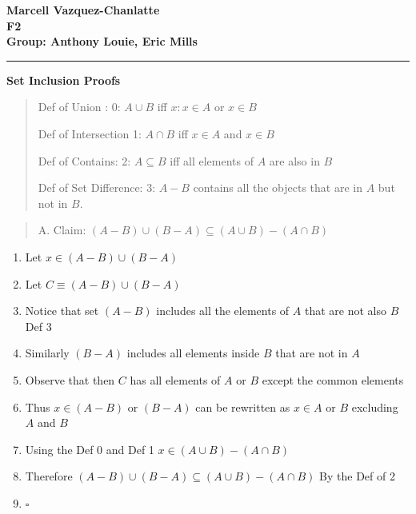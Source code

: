 \documentclass[12pt]{article}
\begin{document}
\begin{center}
  {\LARGE
    \textbf{Marcell Vazquez-Chanlatte}
    \\
    \textbf{F2}
    \\
    \textbf{Group: Anthony Louie, Eric Mills}
    \\[1ex]}

\end{center}

\bigskip\hrule

\begin{enumerate}


\item \textbf{Set Inclusion Proofs}

  \begin{quote}
  \item Def of Union : 0: $A \cup B$ iff  $x:x\in A$ or $x \in B$
  \item Def of Intersection 1: $A \cap B$ iff $x \in A$ and $x \in B$
  \item Def of Contains: 2: $A \subseteq B$ iff all elements of $A$ are also in $B$
  \item Def of Set Difference: 3: $A-B$ contains all the objects that are in $A$ but not in $B$.
  \end{quote}

  \begin{quote}
  \item A. Claim: $(A-B) \cup (B-A) \subseteq (A \cup B) - (A \cap B)$
  \end{quote}

  \begin{enumerate}
  \item Let $x \in (A-B) \cup (B-A)$
  \item Let $ C \equiv (A-B) \cup (B-A)$
  \item Notice that set $(A-B)$ includes all the elements of $A$ that
    are not also $B$ Def 3
  \item Similarly $(B-A)$ includes all elements inside $B$ that are
    not in $A$
  \item Observe that then $C$ has all elements of $A$ or $B$ except
    the common elements
  \item Thus $x\in(A-B)$ or $(B-A)$ can be rewritten as $x\in A$ or
    $B$ excluding $A$ and $B$ 
  \item Using the Def 0 and Def 1 $x \in (A \cup B) -
    (A \cap B)$
  \item Therefore $(A-B) \cup (B-A) \subseteq (A \cup B) - (A \cap B)$
    By the Def of 2
  \item $\square$
  \end{enumerate}



\end{enumerate}
\end{document}
